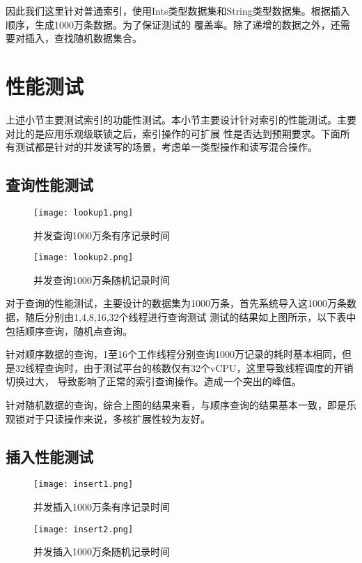 因此我们这里针对普通索引，使用Ints类型数据集和String类型数据集。根据插入顺序，生成1000万条数据。为了保证测试的
覆盖率。除了递增的数据之外，还需要对插入，查找随机数据集合。

\section{性能测试}
上述小节主要测试索引的功能性测试。本小节主要设计针对索引的性能测试。主要对比的是应用乐观级联锁之后，索引操作的可扩展
性是否达到预期要求。下面所有测试都是针对的并发读写的场景，考虑单一类型操作和读写混合操作。

\subsection{查询性能测试}

\begin{figure}[h]
  \centering
  \texttt{[image: lookup1.png]}
  \caption{并发查询1000万条有序记录时间}
  \label{fig:cc-lookup-1}
\end{figure}

\begin{figure}[H]
  \centering
  \texttt{[image: lookup2.png]}
  \caption{并发查询1000万条随机记录时间}
  \label{fig:cc-lookup-2}
\end{figure}

对于查询的性能测试，主要设计的数据集为1000万条，首先系统导入这1000万条数据，随后分别由1,4,8,16,32个线程进行查询测试
测试的结果如上图所示，以下表中包括顺序查询，随机点查询。

针对顺序数据的查询，1至16个工作线程分别查询1000万记录的耗时基本相同，但是32线程查询时，由于测试平台的核数仅有32个vCPU，这里导致线程调度的开销切换过大，
导致影响了正常的索引查询操作。造成一个突出的峰值。

针对随机数据的查询，综合上图的结果来看，与顺序查询的结果基本一致，即是乐观锁对于只读操作来说，多核扩展性较为友好。

\subsection{插入性能测试}

\begin{figure}[H]
  \centering
  \texttt{[image: insert1.png]}
  \caption{并发插入1000万条有序记录时间}
  \label{fig:cc-insert-1}
\end{figure}

\begin{figure}[H]
  \centering
  \texttt{[image: insert2.png]}
  \caption{并发插入1000万条随机记录时间}
  \label{fig:cc-insert-2}
\end{figure}


